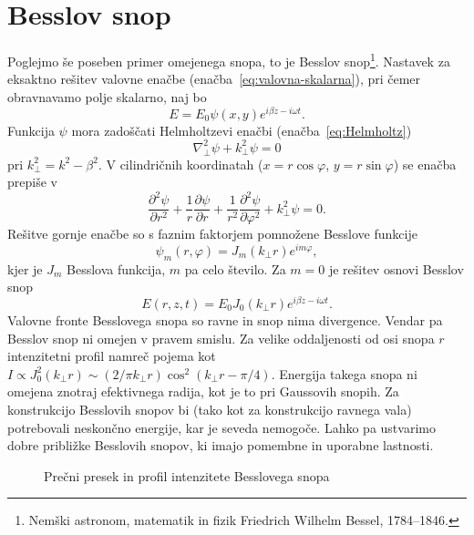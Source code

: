 \section{Besslov snop}

Poglejmo še poseben primer omejenega snopa, to je Besslov
snop\footnote{Nemški astronom, matematik in fizik Friedrich Wilhelm Bessel, 1784--1846.}. 
Nastavek za eksaktno rešitev valovne enačbe (enačba~\ref{eq:valovna-skalarna}), 
pri čemer obravnavamo polje skalarno, naj bo
\begin{equation}
E=E_{0}\psi(x,y)e^{i\beta z-i\omega t}.
\end{equation}
Funkcija $\psi$ mora zadoščati Helmholtzevi enačbi
(enačba~\ref{eq:Helmholtz})
\begin{equation}
\nabla_{\perp}^{2}\psi+k_{\perp}^{2}\psi=0
\end{equation}
pri $k_{\perp}^{2}=k^{2}-\beta^{2}$. V cilindričnih
koordinatah ($x=r\cos\varphi$, $y=r\sin\varphi$) se enačba prepiše v 
\begin{equation}
\frac{\partial^2 \psi}{\partial r^2}+ \frac{1}{r}\frac{\partial \psi}{\partial r}
+ \frac{1}{r^2}\frac{\partial^2 \psi}{\partial \varphi^2}+k_{\perp}^{2}\psi=0.
\end{equation}
Rešitve gornje enačbe so s faznim faktorjem pomnožene Besslove funkcije
\begin{equation}
\psi_m(r, \varphi)=J_{m}(k_{\perp}r)e^{im\varphi},
\end{equation}
kjer je $J_{m}$ Besslova funkcija, $m$ pa celo število. Za
$m=0$ je rešitev osnovi Besslov snop
\begin{equation}
E(r,z,t)=E_{0}J_{0}(k_{\perp}r)e^{i\beta z-i \omega t}.
\label{eq:Besslov-snop}
\end{equation}
Valovne fronte Besslovega snopa so ravne 
in snop nima divergence. Vendar pa Besslov snop ni 
omejen v pravem smislu. Za velike oddaljenosti od osi snopa $r$ intenzitetni profil 
namreč pojema kot $I \propto J_{0}^{2}(k_{\perp}r)\sim (2/\pi k_{\perp}r)\cos^{2}(k_{\perp}r-\pi/4)$.
Energija takega snopa ni omejena znotraj efektivnega radija,
kot je to pri Gaussovih snopih. Za konstrukcijo Besslovih snopov
bi (tako kot za konstrukcijo ravnega vala) potrebovali neskončno energije,
kar je seveda nemogoče. Lahko pa ustvarimo dobre približke Besslovih 
snopov, ki imajo pomembne in uporabne lastnosti. 

\begin{figure}[h]
\centering
\def\svgwidth{70truemm} 

\caption{Prečni presek in profil intenzitete Besslovega snopa}
\label{fig:Besslov_presek}
\end{figure}

